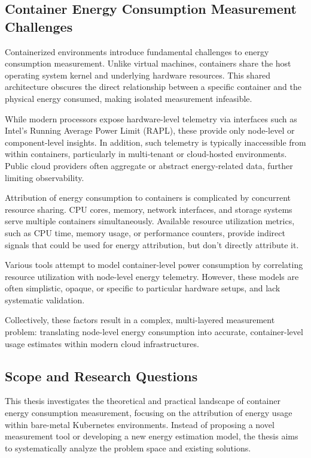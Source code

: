 \subsection{Container Energy Consumption Measurement Challenges}

Containerized environments introduce fundamental challenges to energy consumption measurement. Unlike virtual machines, containers share the host operating system kernel and underlying hardware resources. This shared architecture obscures the direct relationship between a specific container and the physical energy consumed, making isolated measurement infeasible.

While modern processors expose hardware-level telemetry via interfaces such as Intel’s Running Average Power Limit (RAPL), these provide only node-level or component-level insights. In addition, such telemetry is typically inaccessible from within containers, particularly in multi-tenant or cloud-hosted environments. Public cloud providers often aggregate or abstract energy-related data, further limiting observability.

Attribution of energy consumption to containers is complicated by concurrent resource sharing. CPU cores, memory, network interfaces, and storage systems serve multiple containers simultaneously. Available resource utilization metrics, such as CPU time, memory usage, or performance counters, provide indirect signals that could be used for energy attribution, but don't directly attribute it.

Various tools attempt to model container-level power consumption by correlating resource utilization with node-level energy telemetry. However, these models are often simplistic, opaque, or specific to particular hardware setups, and lack systematic validation.

Collectively, these factors result in a complex, multi-layered measurement problem: translating node-level energy consumption into accurate, container-level usage estimates within modern cloud infrastructures.

\subsection{Scope and Research Questions}

This thesis investigates the theoretical and practical landscape of container energy consumption measurement, focusing on the attribution of energy usage within bare-metal Kubernetes environments. Instead of proposing a novel measurement tool or developing a new energy estimation model, the thesis aims to systematically analyze the problem space and existing solutions.

